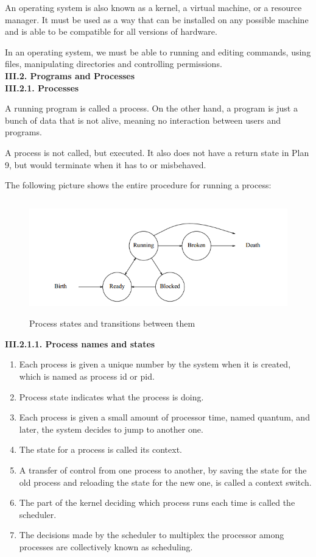 \documentclass[a4paper,12pt]{report}
\begin{document}
\noindent
An operating system is also known as a kernel, a virtual machine, or a resource manager. It must be used as a way that can be installed on any possible machine and is able to be compatible for all versions of hardware. 

\noindent
In an operating system, we must be able to running and editing commands, using files, manipulating directories and controlling permissions.\\

\noindent
\textbf{III.2. Programs and Processes}\\

\noindent
\textbf{III.2.1. Processes}

\noindent
A running program is called a process. On the other hand, a program is just a bunch of data that is not alive, meaning no interaction between users and programs.  

\noindent
A process is not called, but executed. It also does not have a return state in Plan 9, but would terminate when it has to or misbehaved.

\noindent
The following picture shows the entire procedure for running a process:
\begin{figure}[h]
\centering	
\includegraphics[width=14cm, height=5cm]{"pic1"}
\caption{Process states and transitions between them}
\end{figure}

\noindent
\textbf{III.2.1.1. Process names and states}

\noindent
\begin{enumerate}
\item Each process is given a unique number by the system when it is created, which is named as process id or pid. 
\item Process state indicates what the process is doing. 
\item Each process is given a small amount of processor time, named quantum, and later, the system decides to jump to another one.
\item The state for a process is called its context.
\item A transfer of control from one process to another, by saving the state for the old process and reloading the state for the new one, is called a context switch.
\item The part of the kernel deciding which process runs each time is called the scheduler.
\item The decisions made by the scheduler to multiplex the processor among processes are collectively known as scheduling.
\end{enumerate}
\end{document}
